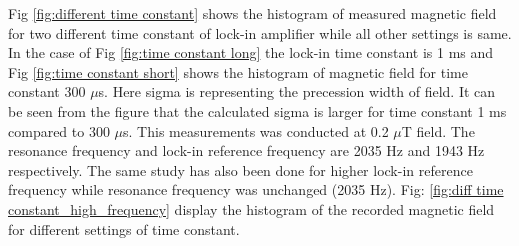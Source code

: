 \begin{itemize}
  Fig \ref{fig:different time constant}  shows the histogram of measured magnetic field for two different time constant of lock-in amplifier while all other settings is same. In the case of Fig \ref{fig:time constant long} the lock-in time constant is 1 ms and Fig \ref{fig:time constant short} shows the histogram of magnetic field for time constant 300 $\mu$s. Here sigma is representing the precession width of field. It can be seen from the figure that the calculated sigma is larger for time constant 1 ms compared to 300 $\mu$s.  This measurements was conducted at 0.2 $\mu$T field. The resonance frequency and lock-in reference frequency are 2035 Hz and 1943 Hz respectively. The same study has also been done for higher lock-in reference frequency while resonance frequency was unchanged (2035 Hz). Fig: \ref{fig:diff time constant_high_frequency} display the histogram of the recorded magnetic field for different settings of time constant.
  
   
   \end{itemize}
